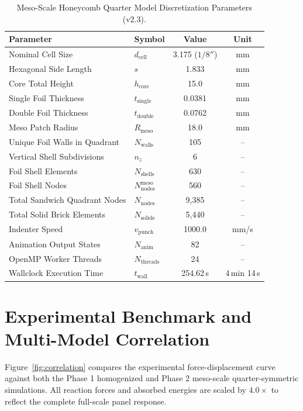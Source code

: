 \documentclass[11pt,a4paper]{article}
\begin{document}
\begin{table}[htbp]
\centering
\caption{Meso-Scale Honeycomb Quarter Model Discretization Parameters (v2.3).}
\label{tab:meso_geom}
\begin{tabular}{@{}llcc@{}}
\toprule
\textbf{Parameter} & \textbf{Symbol} & \textbf{Value} & \textbf{Unit} \\
\midrule
Nominal Cell Size & $d_{\text{cell}}$ & 3.175 ($1/8''$) & mm \\
Hexagonal Side Length & $s$ & 1.833 & mm \\
Core Total Height & $h_{\text{core}}$ & 15.0 & mm \\
Single Foil Thickness & $t_{\text{single}}$ & 0.0381 & mm \\
Double Foil Thickness & $t_{\text{double}}$ & 0.0762 & mm \\
Meso Patch Radius & $R_{\text{meso}}$ & 18.0 & mm \\
Unique Foil Walls in Quadrant & $N_{\text{walls}}$ & 105 & -- \\
Vertical Shell Subdivisions & $n_z$ & 6 & -- \\
Foil Shell Elements & $N_{\text{shells}}$ & 630 & -- \\
Foil Shell Nodes & $N_{\text{nodes}}^{\text{meso}}$ & 560 & -- \\
Total Sandwich Quadrant Nodes & $N_{\text{nodes}}$ & 9,385 & -- \\
Total Solid Brick Elements & $N_{\text{solids}}$ & 5,440 & -- \\
Indenter Speed & $v_{\text{punch}}$ & 1000.0 & mm/s \\
Animation Output States & $N_{\text{anim}}$ & 82 & -- \\
OpenMP Worker Threads & $N_{\text{threads}}$ & 24 & -- \\
Wallclock Execution Time & $t_{\text{wall}}$ & 254.62\,s & 4\,min 14\,s \\
\bottomrule
\end{tabular}
\end{table}

\section{Experimental Benchmark and Multi-Model Correlation}
Figure~\ref{fig:correlation} compares the experimental force-displacement curve against both the Phase 1 homogenized and Phase 2 meso-scale quarter-symmetric simulations. All reaction forces and absorbed energies are scaled by $4.0\times$ to reflect the complete full-scale panel response.
\end{document}
